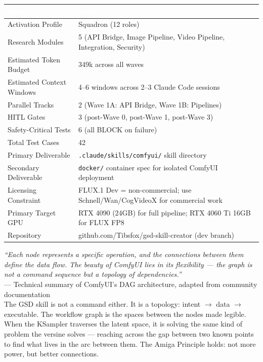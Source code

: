 \documentclass[11pt,letterpaper]{article}
\newcommand{\tableheader}[1]{\textbf{\sffamily\textcolor{white}{#1}}}
\begin{document}
\begin{center}
\begin{tabularx}{\textwidth}{L{5cm}X}
\toprule
{}
\tableheader{Metric} & \tableheader{Value} \\
\midrule
Activation Profile & Squadron (12 roles) \\
Research Modules & 5 (API Bridge, Image Pipeline, Video Pipeline, Integration, Security) \\
Estimated Token Budget & 349k across all waves \\
Estimated Context Windows & 4--6 windows across 2--3 Claude Code sessions \\
Parallel Tracks & 2 (Wave 1A: API Bridge, Wave 1B: Pipelines) \\
HITL Gates & 3 (post-Wave 0, post-Wave 1, post-Wave 3) \\
Safety-Critical Tests & 6 (all BLOCK on failure) \\
Total Test Cases & 42 \\
Primary Deliverable & \texttt{.claude/skills/comfyui/} skill directory \\
Secondary Deliverable & \texttt{docker/} container spec for isolated ComfyUI deployment \\
Licensing Constraint & FLUX.1 Dev = non-commercial; use Schnell/Wan/CogVideoX for commercial work \\
Primary Target GPU & RTX 4090 (24GB) for full pipeline; RTX 4060 Ti 16GB for FLUX FP8 \\
Repository & github.com/Tibsfox/gsd-skill-creator (dev branch) \\
\bottomrule
\end{tabularx}
\end{center}

\vspace{2em}

\begin{quotebox}
\textit{``Each node represents a specific operation, and the connections between them define
the data flow. The beauty of ComfyUI lies in its flexibility --- the graph is not a
command sequence but a topology of dependencies.''}\\[0.5em]
--- Technical summary of ComfyUI's DAG architecture, adapted from community documentation\\[1em]
The GSD skill is not a command either. It is a topology: intent $\rightarrow$ data
$\rightarrow$ executable. The workflow graph is the spaces between the nodes made legible.
When the KSampler traverses the latent space, it is solving the same kind of problem
the versine solves --- reaching across the gap between two known points to find what
lives in the arc between them. The Amiga Principle holds: not more power, but better
connections.
\end{quotebox}
\end{document}
